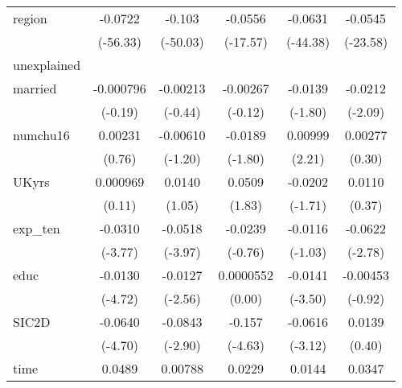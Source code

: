 \begin{table}[htbp]
\begin{tabular}{l*{5}{c}}
region      &     -0.0722\sym{***}&      -0.103\sym{***}&     -0.0556\sym{***}&     -0.0631\sym{***}&     -0.0545\sym{***}\\
            &    (-56.33)         &    (-50.03)         &    (-17.57)         &    (-44.38)         &    (-23.58)         \\
\hline
unexplained &                     &                     &                     &                     &                     \\
married     &   -0.000796         &    -0.00213         &    -0.00267         &     -0.0139         &     -0.0212\sym{*}  \\
            &     (-0.19)         &     (-0.44)         &     (-0.12)         &     (-1.80)         &     (-2.09)         \\
numchu16    &     0.00231         &    -0.00610         &     -0.0189         &     0.00999\sym{*}  &     0.00277         \\
            &      (0.76)         &     (-1.20)         &     (-1.80)         &      (2.21)         &      (0.30)         \\
UKyrs       &    0.000969         &      0.0140         &      0.0509         &     -0.0202         &      0.0110         \\
            &      (0.11)         &      (1.05)         &      (1.83)         &     (-1.71)         &      (0.37)         \\
exp\_ten     &     -0.0310\sym{***}&     -0.0518\sym{***}&     -0.0239         &     -0.0116         &     -0.0622\sym{**} \\
            &     (-3.77)         &     (-3.97)         &     (-0.76)         &     (-1.03)         &     (-2.78)         \\
educ        &     -0.0130\sym{***}&     -0.0127\sym{*}  &   0.0000552         &     -0.0141\sym{***}&    -0.00453         \\
            &     (-4.72)         &     (-2.56)         &      (0.00)         &     (-3.50)         &     (-0.92)         \\
SIC2D       &     -0.0640\sym{***}&     -0.0843\sym{**} &      -0.157\sym{***}&     -0.0616\sym{**} &      0.0139         \\
            &     (-4.70)         &     (-2.90)         &     (-4.63)         &     (-3.12)         &      (0.40)         \\
time        &      0.0489\sym{***}&     0.00788         &      0.0229\sym{*}  &      0.0144\sym{*}  &      0.0347\sym{*}  \\

\end{tabular}
\end{table}
